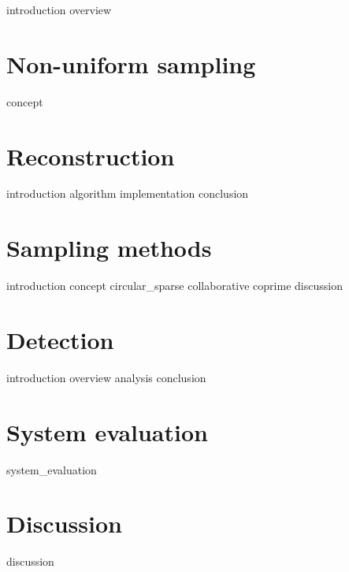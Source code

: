 \documentclass[a4paper, openany, oneside]{memoir}
\begin{document}
\label{cha:overview}
{introduction}
{overview}

\chapter{Non-uniform sampling}
\label{cha:sampling}
{concept}

\chapter{Reconstruction}
\label{cha:reconstruction}
{introduction}
{algorithm}
{implementation}
{conclusion}

\chapter{Sampling methods}
\label{cha:sampling_methods}
{introduction}
{concept}
{circular_sparse}
{collaborative}
{coprime}
{discussion}

\chapter{Detection}
\label{cha:detection}
{introduction}
{overview}
{analysis}
{conclusion}

\chapter{System evaluation}
\label{cha:system_evaluation_theory}
{system_evaluation}

\chapter{Discussion}
\label{cha:discussion_theory}
{discussion}
\end{document}
